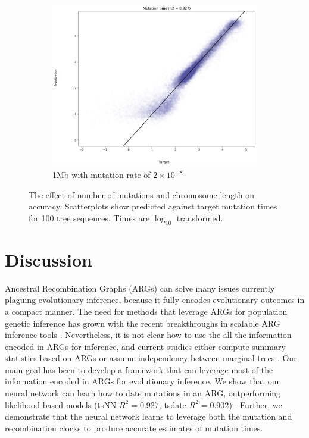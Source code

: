 \begin{figure}[htp]
\begin{subfigure}[b]{.51\linewidth}
\end{subfigure}
\hfill
\begin{subfigure}[b]{.51\linewidth}
\includegraphics[width=\linewidth]{tsnn_figs/tsnn_ntrain_900_clen_1mb_mut-rate_2e-8_ssize_100_scatter_val_redone.jpg}
\caption{1Mb with mutation rate of $2\times10^{-8}$}\label{fig:1mb_8}
\end{subfigure}
\caption[The effect of number of mutations and chromosome length on accuracy]{
The effect of number of mutations and chromosome length on accuracy.
Scatterplots show predicted against target mutation times for 100 tree sequences.
Times are $\log_{10}$ transformed.
}
\label{fig:tsnn_vs_gnn}
\end{figure}


\section{Discussion}

Ancestral Recombination Graphs (ARGs) can solve many issues currently plaguing evolutionary inference, 
because it fully encodes evolutionary outcomes in a compact manner.
The need for methods that leverage ARGs for population genetic inference has grown with the recent breakthroughs in scalable ARG inference tools \citep{kelleher_inferring_2019, speidel_method_2019, rasmussen_genome-wide_2014}.
Nevertheless, it is not clear how to use the all the information encoded in ARGs for inference,
and current studies either compute summary statistics based on ARGs or assume independency between marginal trees \citep{fan_likelihood-based_2023, hejase_deep-learning_2022}.
Our main goal has been to develop a framework that can leverage most of the information encoded in ARGs for evolutionary inference.
We show that our neural network can learn how to date mutations in an ARG,
outperforming likelihood-based models (tsNN $R^2=0.927$, tsdate $R^2=0.902$) \citep{wohns_unified_2022}.
Further, we demonstrate that the neural network learns to leverage both the mutation and recombination clocks to produce accurate estimates of mutation times.

